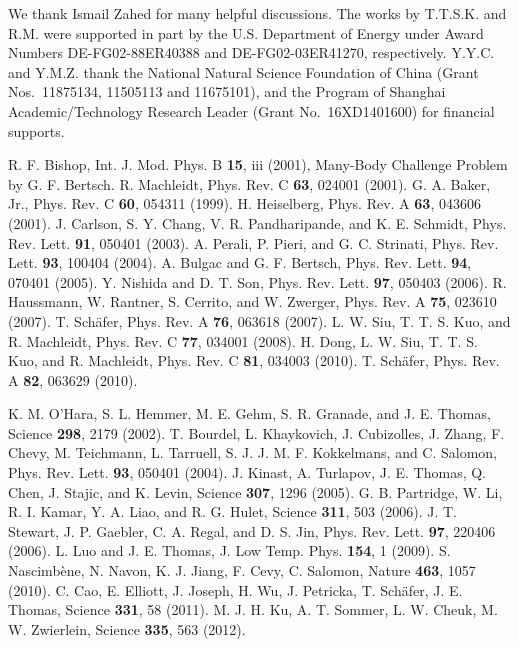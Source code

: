 \documentclass[twocolumn,preprintnumbers,superscriptaddress]{revtex4}
\begin{document}
\begin{acknowledgments}
We thank Ismail Zahed for many helpful discussions.
The works by T.T.S.K. and R.M. were supported in part by the U.S. Department of Energy
under Award Numbers DE-FG02-88ER40388 and DE-FG02-03ER41270, respectively.
Y.Y.C. and Y.M.Z. thank the National Natural Science Foundation of China (Grant Nos.~11875134, 11505113 and 11675101),
and the Program of Shanghai Academic/Technology Research Leader (Grant No.~16XD1401600) for financial supports.
\end{acknowledgments}

\begin{thebibliography}{50}

 R. F. Bishop, Int. J. Mod. Phys. B {\bf 15}, iii (2001), Many-Body Challenge Problem by G. F. Bertsch.
 R. Machleidt, Phys. Rev. C {\bf 63}, 024001 (2001).
 G. A. Baker, Jr., Phys. Rev. C {\bf 60}, 054311 (1999).
 H. Heiselberg, Phys. Rev. A {\bf 63}, 043606 (2001).
 J. Carlson, S. Y. Chang, V. R. Pandharipande, and K. E. Schmidt, Phys. Rev. Lett. {\bf 91}, 050401 (2003).
 A. Perali, P. Pieri, and G. C. Strinati, Phys. Rev. Lett. {\bf 93}, 100404 (2004).
 A. Bulgac and G. F. Bertsch, Phys. Rev. Lett. {\bf 94}, 070401 (2005).
 Y. Nishida and D. T. Son, Phys. Rev. Lett. {\bf 97}, 050403 (2006).
 R. Haussmann, W. Rantner, S. Cerrito, and W. Zwerger, Phys. Rev. A {\bf 75}, 023610 (2007).
 T. Sch\"{a}fer, Phys. Rev. A {\bf 76}, 063618 (2007).
 L. W. Siu, T. T. S. Kuo, and R. Machleidt, Phys. Rev. C {\bf 77}, 034001 (2008).
 H. Dong, L. W. Siu, T. T. S. Kuo, and R. Machleidt, Phys. Rev. C {\bf 81}, 034003 (2010).
 T. Sch\"{a}fer, Phys. Rev. A {\bf 82}, 063629 (2010).

 K. M. O'Hara, S. L. Hemmer, M. E. Gehm, S. R. Granade, and J. E. Thomas, Science {\bf 298}, 2179 (2002).
 T. Bourdel, L. Khaykovich, J. Cubizolles, J. Zhang, F. Chevy, M. Teichmann, L. Tarruell, S. J. J. M. F. Kokkelmans, and C. Salomon, Phys. Rev. Lett. {\bf 93}, 050401 (2004).
 J. Kinast, A. Turlapov, J. E. Thomas, Q. Chen, J. Stajic, and K. Levin, Science {\bf 307}, 1296 (2005).
 G. B. Partridge, W. Li, R. I. Kamar, Y. A. Liao, and R. G. Hulet, Science {\bf 311}, 503 (2006).
 J. T. Stewart, J. P. Gaebler, C. A. Regal, and D. S. Jin, Phys. Rev. Lett. {\bf 97}, 220406 (2006).
 L. Luo and J. E. Thomas, J. Low Temp. Phys. {\bf 154}, 1 (2009).
 S. Nascimb\`{e}ne, N. Navon, K. J. Jiang, F. Cevy, C. Salomon, Nature {\bf 463}, 1057 (2010).
 C. Cao, E. Elliott, J. Joseph, H. Wu, J. Petricka, T. Sch\"{a}fer, J. E. Thomas, Science {\bf 331}, 58 (2011).
 M. J. H. Ku, A. T. Sommer, L. W. Cheuk, M. W. Zwierlein, Science {\bf 335}, 563 (2012).


\end{thebibliography}
\end{document}
